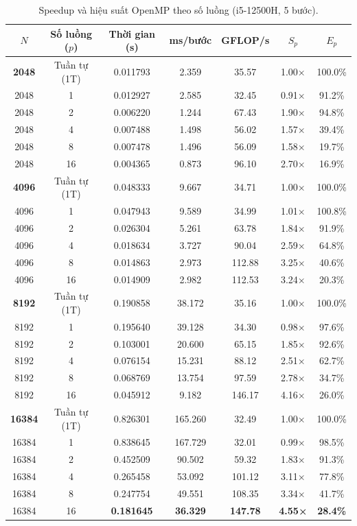 \begin{table}[!htbp]
\centering\small
\setlength{\tabcolsep}{4pt}
\begin{tabular}{ccccccc}
\toprule
\textbf{$N$} & \textbf{Số luồng ($p$)} & \textbf{Thời gian (s)} & \textbf{ms/bước} & \textbf{GFLOP/s} & \textbf{$S_p$} & \textbf{$E_p$} \\
\midrule
\textbf{2048} & Tuần tự (1T) & 0.011793 & 2.359 & 35.57 & 1.00× & 100.0\% \\
2048 & 1 & 0.012927 & 2.585 & 32.45 & 0.91× & 91.2\% \\
2048 & 2 & 0.006220 & 1.244 & 67.43 & 1.90× & 94.8\% \\
2048 & 4 & 0.007488 & 1.498 & 56.02 & 1.57× & 39.4\% \\
2048 & 8 & 0.007478 & 1.496 & 56.09 & 1.58× & 19.7\% \\
2048 & 16 & 0.004365 & 0.873 & 96.10 & 2.70× & 16.9\% \\
\textbf{4096} & Tuần tự (1T) & 0.048333 & 9.667 & 34.71 & 1.00× & 100.0\% \\
4096 & 1 & 0.047943 & 9.589 & 34.99 & 1.01× & 100.8\% \\
4096 & 2 & 0.026304 & 5.261 & 63.78 & 1.84× & 91.9\% \\
4096 & 4 & 0.018634 & 3.727 & 90.04 & 2.59× & 64.8\% \\
4096 & 8 & 0.014863 & 2.973 & 112.88 & 3.25× & 40.6\% \\
4096 & 16 & 0.014909 & 2.982 & 112.53 & 3.24× & 20.3\% \\
\textbf{8192} & Tuần tự (1T) & 0.190858 & 38.172 & 35.16 & 1.00× & 100.0\% \\
8192 & 1 & 0.195640 & 39.128 & 34.30 & 0.98× & 97.6\% \\
8192 & 2 & 0.103001 & 20.600 & 65.15 & 1.85× & 92.6\% \\
8192 & 4 & 0.076154 & 15.231 & 88.12 & 2.51× & 62.7\% \\
8192 & 8 & 0.068769 & 13.754 & 97.59 & 2.78× & 34.7\% \\
8192 & 16 & 0.045912 & 9.182 & 146.17 & 4.16× & 26.0\% \\
\textbf{16384} & Tuần tự (1T) & 0.826301 & 165.260 & 32.49 & 1.00× & 100.0\% \\
16384 & 1 & 0.838645 & 167.729 & 32.01 & 0.99× & 98.5\% \\
16384 & 2 & 0.452509 & 90.502 & 59.32 & 1.83× & 91.3\% \\
16384 & 4 & 0.265458 & 53.092 & 101.12 & 3.11× & 77.8\% \\
16384 & 8 & 0.247754 & 49.551 & 108.35 & 3.34× & 41.7\% \\
16384 & 16 & \textbf{0.181645} & \textbf{36.329} & \textbf{147.78} & \textbf{4.55×} & \textbf{28.4\%} \\
\bottomrule
\end{tabular}
\caption{Speedup và hiệu suất OpenMP theo số luồng (i5-12500H, 5 bước).}
\label{tab:omp-threads}
\end{table}

